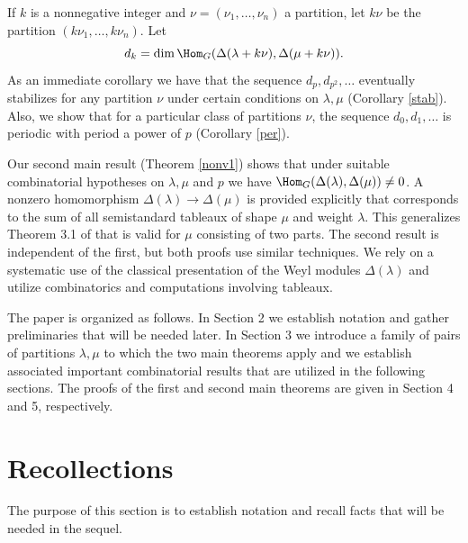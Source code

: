If $k$ is a nonnegative integer and $\nu=(\nu_1,\dots,\nu_n)$ a partition, let $k\nu$ be the partition $(k\nu_1,\dots,k\nu_n).$ Let \[d_k=\dim \Hom _{G}(\Delta (\lambda + k \nu), \Delta(\mu + k \nu)).\]As an immediate corollary we have  that the sequence $d_{p}, d_{p^2}, \dots$ eventually stabilizes for any partition $\nu$ under certain conditions on $\lambda, \mu$ (Corollary \ref{stab}). Also, we show that for a particular class of partitions $\nu$, the sequence $d_{0}, d_1, \dots$ is periodic with period a power of $p$ (Corollary \ref{per}).

Our second main result (Theorem \ref{nonv1}) shows that under suitable combinatorial hypotheses on $\lambda, \mu$ and $p$ we have $\Hom_G(\Delta(\lambda), \Delta(\mu)) \neq 0$. A nonzero homomorphism $\Delta (\lambda) \to \Delta (\mu)$ is provided explicitly that corresponds to the sum of all semistandard tableaux of shape $\mu$ and weight $\lambda$. This generalizes Theorem 3.1 of \cite{MS3} that is valid for $\mu$ consisting of two parts. The second result is independent of the first, but both proofs use similar techniques. We rely on a systematic use of the classical presentation of the Weyl modules $\Delta(\lambda)$ and utilize combinatorics and computations involving tableaux.

The paper is organized as follows. In Section 2 we establish notation and gather preliminaries that will be needed later. In Section 3 we introduce a family of pairs of partitions $\lambda, \mu$ to which the two main theorems apply and we establish associated important combinatorial results that are utilized in the following sections. The proofs of the first and second main theorems are given in Section 4 and 5, respectively.

\section{Recollections}
The purpose of this section is to establish notation and recall facts that will be needed in the sequel.

